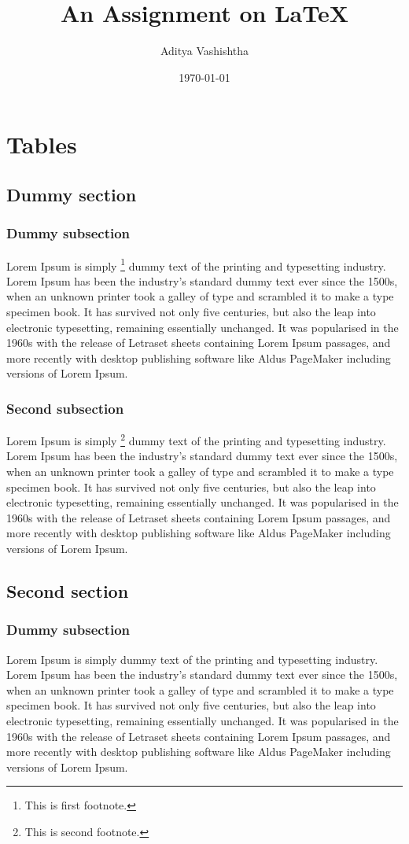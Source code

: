 \documentclass{report}
\title{An Assignment on \LaTeX}
\author{Aditya Vashishtha}
\date{\today}
\begin{document}
    \maketitle
    \tableofcontents
    \chapter{Tables}
        \section{Dummy section} \label{sec:1}
        \subsection{Dummy subsection}
        Lorem Ipsum is simply {\footnote{This is first footnote.}} dummy text of the {printing and typesetting industry.}  \rm Lorem Ipsum has been the industry's standard dummy text ever since the 1500s, when an unknown printer took a galley of type and scrambled it to make a type specimen book. It has survived not only five centuries, but also the leap into electronic typesetting, remaining essentially unchanged. It was popularised in the 1960s with the release of Letraset sheets containing Lorem Ipsum passages, and more recently with desktop publishing software like Aldus PageMaker including versions of Lorem Ipsum.
        \subsection{Second subsection}
        Lorem Ipsum is simply \footnote{This is second footnote.} dummy text of the {printing and typesetting industry.}  \rm Lorem Ipsum has been the industry's standard dummy text ever since the 1500s, when an unknown printer took a galley of type and scrambled it to make a type specimen book. It has survived not only five centuries, but also the leap into electronic typesetting, remaining essentially unchanged. It was popularised in the 1960s with the release of Letraset sheets containing Lorem Ipsum passages, and more recently with desktop publishing software like Aldus PageMaker including versions of Lorem Ipsum.
        \section{Second section}
        \subsection{Dummy subsection}
        Lorem Ipsum is simply dummy text of the {printing and typesetting industry.}  \rm Lorem Ipsum has been the industry's standard dummy text ever since the 1500s, when an unknown printer took a galley of type and scrambled it to make a type specimen book. It has survived not only five centuries, but also the leap into electronic typesetting, remaining essentially unchanged. It was popularised in the 1960s with the release of Letraset sheets containing Lorem Ipsum passages, and more recently with desktop publishing software like Aldus PageMaker including versions of Lorem Ipsum.
\end{document}
